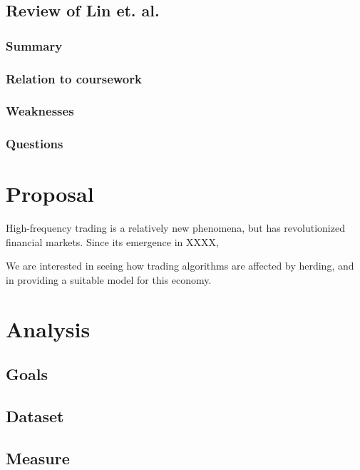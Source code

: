 \documentclass{article}
\begin{document}
\subsection{Review of Lin et. al.}
\subsubsection{Summary}
\subsubsection{Relation to coursework}
\subsubsection{Weaknesses}
\subsubsection{Questions}

\section{Proposal}

High-frequency trading is a relatively new phenomena, but has revolutionized financial markets. 
Since its emergence in XXXX, 

We are interested in seeing how trading algorithms are affected by herding, and in providing a suitable model for this economy.

\section{Analysis}
\subsection{Goals}
\subsection{Dataset}
\subsection{Measure}
\end{document}
